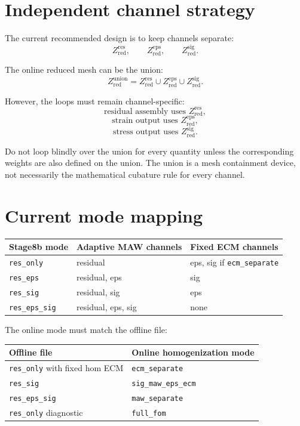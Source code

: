 \documentclass[11pt]{article}
\newcommand{\zred}{Z_{\mathrm{red}}}
\begin{document}
\section{Independent channel strategy}

The current recommended design is to keep channels separate:
\[
  \zred^{\mathrm{res}},
  \qquad
  \zred^{\mathrm{eps}},
  \qquad
  \zred^{\mathrm{sig}}.
\]

The online reduced mesh can be the union:
\[
  \zred^{\mathrm{union}}
  =
  \zred^{\mathrm{res}}
  \cup
  \zred^{\mathrm{eps}}
  \cup
  \zred^{\mathrm{sig}}.
\]

However, the loops must remain channel-specific:
\[
  \text{residual assembly uses } \zred^{\mathrm{res}},
\]
\[
  \text{strain output uses } \zred^{\mathrm{eps}},
\]
\[
  \text{stress output uses } \zred^{\mathrm{sig}}.
\]

Do not loop blindly over the union for every quantity unless the corresponding
weights are also defined on the union.  The union is a mesh containment device, not
necessarily the mathematical cubature rule for every channel.

\section{Current mode mapping}

\begin{center}
\begin{tabular}{lll}
\toprule
Stage8b mode & Adaptive MAW channels & Fixed ECM channels\\
\midrule
\texttt{res\_only} & residual & eps, sig if \texttt{ecm\_separate}\\
\texttt{res\_eps} & residual, eps & sig\\
\texttt{res\_sig} & residual, sig & eps\\
\texttt{res\_eps\_sig} & residual, eps, sig & none\\
\bottomrule
\end{tabular}
\end{center}

The online mode must match the offline file:
\begin{center}
\begin{tabular}{ll}
\toprule
Offline file & Online homogenization mode\\
\midrule
\texttt{res\_only} with fixed hom ECM & \texttt{ecm\_separate}\\
\texttt{res\_sig} & \texttt{sig\_maw\_eps\_ecm}\\
\texttt{res\_eps\_sig} & \texttt{maw\_separate}\\
\texttt{res\_only} diagnostic & \texttt{full\_fom}\\
\bottomrule
\end{tabular}
\end{center}
\end{document}
